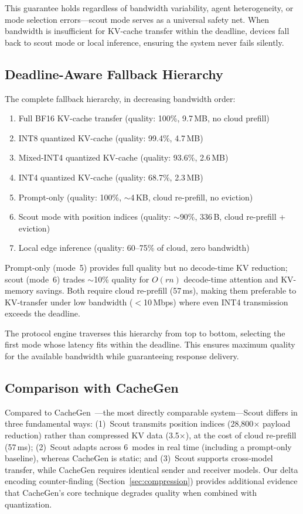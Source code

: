 \documentclass[journal]{IEEEtran}
\begin{document}
This guarantee holds regardless of bandwidth variability, agent heterogeneity, or mode selection errors---scout mode serves as a universal safety net.
When bandwidth is insufficient for KV-cache transfer within the deadline, devices fall back to scout mode or local inference, ensuring the system never fails silently.

\subsection{Deadline-Aware Fallback Hierarchy}

The complete fallback hierarchy, in decreasing bandwidth order:
\begin{enumerate}
    \item Full BF16 KV-cache transfer (quality: 100\%, 9.7\,MB, no cloud prefill)
    \item INT8 quantized KV-cache (quality: 99.4\%, 4.7\,MB)
    \item Mixed-INT4 quantized KV-cache (quality: 93.6\%, 2.6\,MB)
    \item INT4 quantized KV-cache (quality: 68.7\%, 2.3\,MB)
    \item Prompt-only (quality: 100\%, $\sim$4\,KB, cloud re-prefill, no eviction)
    \item Scout mode with position indices (quality: $\sim$90\%, 336\,B, cloud re-prefill + eviction)
    \item Local edge inference (quality: 60--75\% of cloud, zero bandwidth)
\end{enumerate}
Prompt-only (mode~5) provides full quality but no decode-time KV reduction; scout (mode~6) trades $\sim$10\% quality for $O(rn)$ decode-time attention and KV-memory savings.
Both require cloud re-prefill (57\,ms), making them preferable to KV-transfer under low bandwidth ($<$10\,Mbps) where even INT4 transmission exceeds the deadline.

The protocol engine traverses this hierarchy from top to bottom, selecting the first mode whose latency fits within the deadline.
This ensures maximum quality for the available bandwidth while guaranteeing response delivery.

\subsection{Comparison with CacheGen}

Compared to CacheGen~\cite{cachegen}---the most directly comparable system---Scout differs in three fundamental ways: (1)~Scout transmits position indices (28,800$\times$ payload reduction) rather than compressed KV data (3.5$\times$), at the cost of cloud re-prefill (57\,ms); (2)~Scout adapts across 6~modes in real time (including a prompt-only baseline), whereas CacheGen is static; and (3)~Scout supports cross-model transfer, while CacheGen requires identical sender and receiver models.
Our delta encoding counter-finding (Section~\ref{sec:compression}) provides additional evidence that CacheGen's core technique degrades quality when combined with quantization.
\end{document}
